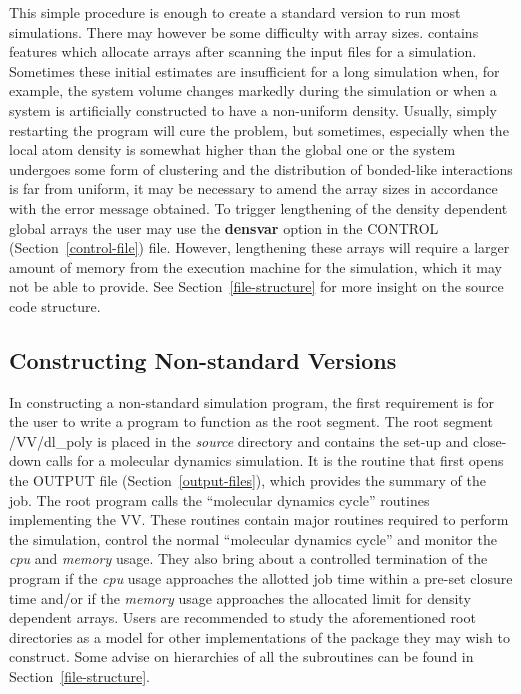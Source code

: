 This simple procedure is enough to create a standard version to run
most simulations.  There may however be some difficulty with array
sizes.  \D contains features which allocate arrays after scanning
the input files for a simulation.  Sometimes these initial estimates
are insufficient for a long simulation when, for example, the system
volume changes markedly during the simulation or when a system is
artificially constructed to have a non-uniform density.  Usually,
simply restarting the program will cure the problem, but sometimes,
especially when the local atom density is somewhat higher than the
global one or the system undergoes some form of clustering and the
distribution of bonded-like interactions is far from uniform, it
may be necessary to amend the array sizes in accordance with the
error message obtained.  To trigger lengthening of the density
dependent global arrays the user may use the {\bf densvar} option in
the CONTROL (Section~\ref{control-file}) file.  However, lengthening
these arrays will require a larger amount of memory from the
execution machine for the simulation, which it may not be able to
provide.  See Section~\ref{file-structure} for more insight on the
\D source code structure.

\subsection{Constructing Non-standard Versions}

In constructing a non-standard \D simulation program, the first
requirement is for the user to write a program to function as the
root segment.  The root segment {\sc /VV/dl\_poly} is placed in the
{\em source} directory and contains the set-up and close-down calls
for a molecular dynamics simulation.  It is the routine that first
opens the OUTPUT file (Section~\ref{output-files}), which provides
the summary of the job.  The root program calls the ``molecular
dynamics cycle'' routines
implementing the VV. These routines contain major routines
required to perform the simulation, control the normal ``molecular
dynamics cycle'' and monitor the {\em cpu} and {\em memory} usage.
They also bring about a controlled termination of the program if
the {\em cpu} usage approaches the allotted job time within a
pre-set closure time and/or if the {\em memory} usage approaches the
allocated limit for density dependent arrays.   Users are recommended
to study the aforementioned root directories as a model for other
implementations of the package they may wish to construct.  Some
advise on hierarchies of all the \D subroutines can be found in
Section~\ref{file-structure}.

